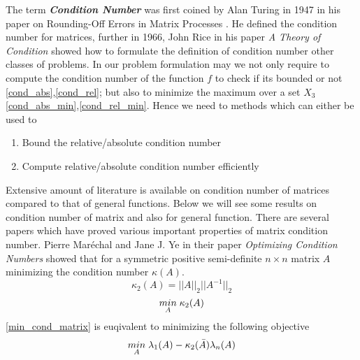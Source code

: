 \newpage
{}
The term \textbf{\textit{Condition Number}} was first coined by Alan Turing in 1947 in his paper on Rounding-Off Errors in Matrix Processes \cite{turing1948rounding}. He defined the condition number for matrices, further in 1966, John Rice in his paper \textit{A Theory of Condition} \cite{rice1966theory} showed how to formulate the definition of condition number other classes of problems.
\newline\newline In our problem formulation may we not only require to compute the condition number of the function $f$ to check if its bounded or not \ref{cond_abs},\ref{cond_rel}; but also to minimize the maximum over a set $X_3$ \ref{cond_abs_min},\ref{cond_rel_min}.
\newline\newline Hence we need to methods which can either be used to 
\begin{enumerate}
    \item Bound the relative/absolute condition number
    \item Compute relative/absolute condition number efficiently
\end{enumerate}
Extensive amount of literature is available on condition number of matrices compared to that of general functions. Below we will see some results on condition number of matrix and also for general function.
There are several papers which have proved various important properties of matrix condition number. Pierre Maréchal and Jane J. Ye in their paper \textit{Optimizing Condition Numbers}\cite{marechal2009optimizing} showed that for a symmetric positive semi-definite $n\times n$ matrix $A$ minimizing the condition number $\kappa (A)$.
\begin{equation} \label{cond_matrix}
    \kappa_2 (A) = ||A||_2||A^{-1}||_2
\end{equation}
\begin{equation} \label{min_cond_matrix}
    \underset{A}{min}\hspace{1mm} \kappa_2 (A)
\end{equation}
\ref{min_cond_matrix} is euqivalent to minimizing the following objective
\begin{equation}
    \underset{A}{min}\hspace{1mm} \lambda_1(A) - \kappa_2 (\Bar{A}) \lambda_n(A)
\end{equation}

